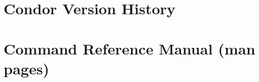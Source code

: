\documentclass[titlepage,oneside]{book}
\begin{document}
\chapter{Condor Version History}
\label{Version-History}


\chapter{Command Reference Manual (man pages)}
\label{sec:command-reference}


%
%
  \fancyhead[LE,RO]{\thepage}
  \fancyhead[RE]{\leftmark}
  \fancyhead[LO]{\rightmark}

\backmatter
{}
\label{index}
\printindex
\end{document}
